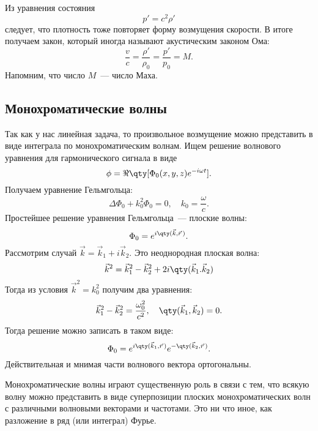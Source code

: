 Из уравнения состояния
\begin{equation}
    p' = c^2\rho'
\end{equation}
следует, что плотность  тоже повторяет форму возмущения скорости. В итоге получаем закон, который иногда называют акустическим законом Ома:
\begin{equation}
    \frac{v}{c} = \frac{\rho'}{\rho_0} = \frac{p'}{p_0}=M.
\end{equation}
Напомним, что число $M$~--- число Маха.

\subsection{Монохроматические волны}
\label{ssec:monowaves}
Так как у нас линейная задача, то произвольное возмущение можно представить в виде интеграла по монохроматическим волнам. Ищем решение волнового уравнения для гармонического сигнала в виде
\begin{equation}
    \phi = \Re\qty[\Phi_0(x,y,z)e^{-i\omega t}].
\end{equation}
Получаем уравнение Гельмгольца:
\begin{equation}
    \Delta \Phi_0+k_0^2 \Phi_0 = 0,\quad k_0=\frac{\omega}{c}.
\end{equation}
Простейшее решение уравнения Гельмгольца~--- плоские волны:
\begin{equation}
    \Phi_0 = e^{i\qty(\vec{k}, \vec{r}\,)}.
\end{equation}
Рассмотрим случай $\vec{k} = \vec{k}_1 + i\vec{k}_2$. Это неоднородная плоская волна:
\begin{equation}
    \vec{k}^2 = \vec{k}_1^2 - \vec{k}_2^2 +2i \qty(\vec{k}_1.\vec{k}_2)
\end{equation}
Тогда из условия $\vec{k}^2 = k_0^2$ получим два уравнения:
\begin{equation}
    \vec{k}_1^2-\vec{k}_2^2 = \frac{\omega_0^2}{c^2}, \quad
    \qty(\vec{k}_1,\vec{k}_2)=0.
\end{equation}
Тогда решение можно записать в таком виде:
\begin{equation}
    \Phi_0 = e^{i\qty(\vec{k}_1, \vec{r}\,)}e^{-\qty(\vec{k}_2,\vec{r}\,)}.
\end{equation}
Действительная и мнимая части волнового вектора ортогональны.

Монохроматические волны играют существенную роль в связи с тем, что всякую волну можно представить в виде суперпозиции плоских монохроматических волн с различными волновыми векторами и частотами. Это ни что иное, как разложение в ряд (или интеграл) Фурье\footnotemark.

